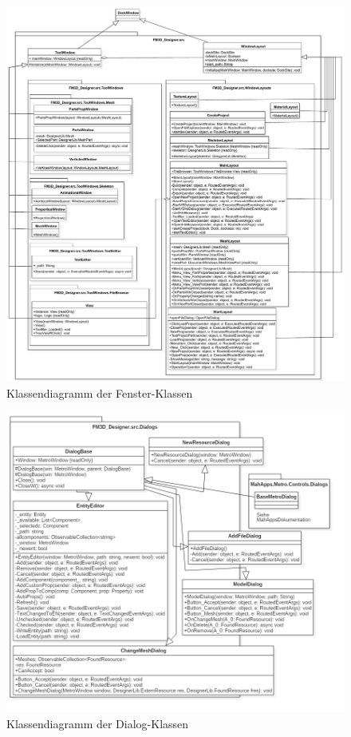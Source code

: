 \begin{figure}
	\begin{center}
		\includegraphics[width=\textwidth]{03unserprogramm/Designer/Fenster.pdf}
		\caption{Klassendiagramm der Fenster-Klassen}\label{windowclass}
	\end{center}
\end{figure}

\begin{figure}
	\begin{center}
		\includegraphics[width=\textwidth]{03unserprogramm/Designer/Dialogs.png}
		\caption{Klassendiagramm der Dialog-Klassen}\label{dialogclass}
	\end{center}
\end{figure}

